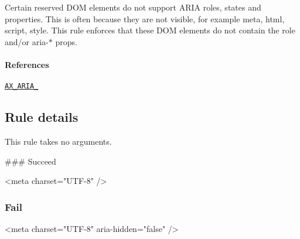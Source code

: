 Certain reserved D\+OM elements do not support A\+R\+IA roles, states and properties. This is often because they are not visible, for example {\ttfamily meta}, {\ttfamily html}, {\ttfamily script}, {\ttfamily style}. This rule enforces that these D\+OM elements do not contain the {\ttfamily role} and/or {\ttfamily aria-\/$\ast$} props.

\paragraph*{References}


\begin{DoxyEnumerate}
\item \href{https://github.com/GoogleChrome/accessibility-developer-tools/wiki/Audit-Rules#ax_aria_12}{\tt A\+X\+\_\+\+A\+R\+I\+A\+\_}
\end{DoxyEnumerate}

\subsection*{Rule details}

This rule takes no arguments.

\#\#\# Succeed 
\begin{DoxyCode}
<meta charset="UTF-8" />
\end{DoxyCode}


\subsubsection*{Fail}


\begin{DoxyCode}
<meta charset="UTF-8" aria-hidden="false" />
\end{DoxyCode}
 